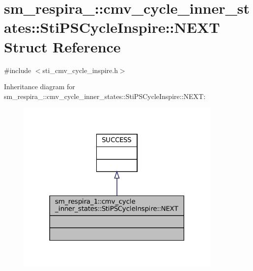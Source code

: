 \hypertarget{structsm__respira__1_1_1cmv__cycle__inner__states_1_1StiPSCycleInspire_1_1NEXT}{}\section{sm\+\_\+respira\+\_\+:\+:cmv\+\_\+cycle\+\_\+inner\+\_\+states\+:\+:Sti\+P\+S\+Cycle\+Inspire\+:\+:N\+E\+XT Struct Reference}
\label{structsm__respira__1_1_1cmv__cycle__inner__states_1_1StiPSCycleInspire_1_1NEXT}


{\ttfamily \#include $<$sti\+\_\+cmv\+\_\+cycle\+\_\+inspire.\+h$>$}



Inheritance diagram for sm\+\_\+respira\+\_\+:\+:cmv\+\_\+cycle\+\_\+inner\+\_\+states\+:\+:Sti\+P\+S\+Cycle\+Inspire\+:\+:N\+E\+XT\+:
\nopagebreak
\begin{figure}[H]
\begin{center}
\leavevmode
\includegraphics[width=285pt]{structsm__respira__1_1_1cmv__cycle__inner__states_1_1StiPSCycleInspire_1_1NEXT__inherit__graph}
\end{center}
\end{figure}


